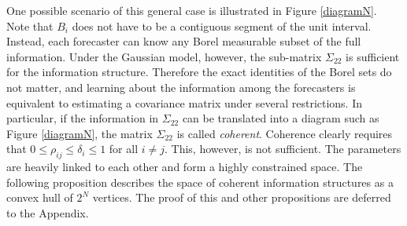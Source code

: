\documentclass[11pt]{article}
\theoremstyle{definition}
\newtheorem{example}[theorem]{Example}
\theoremstyle{definition}
\begin{document}
One possible scenario of this general case is illustrated in Figure \ref{diagramN}. Note that $B_i$ does not have to be a contiguous segment of the unit
interval.  Instead, each forecaster can know any Borel measurable
subset of the full information. Under the Gaussian model, however, the sub-matrix $\Sigma_{22}$ is sufficient for the information structure. Therefore the exact identities of the Borel sets do not matter, and learning about the
information among the forecasters is equivalent to estimating a
covariance matrix under several restrictions.  In particular, if the
information in $\Sigma_{22}$ can be translated into a diagram
such as Figure \ref{diagramN},
the matrix $\Sigma_{22}$ is called \textit{coherent}.  Coherence
clearly requires that $0 \leq \rho_{ij} \leq \delta_i \leq 1$ for all $i \neq j$.  This, however, is not sufficient. The parameters are heavily linked to each other and form a highly constrained space. 
%
The following proposition describes the space of coherent information structures as a convex hull of $2^N$ vertices.
 The proof of this and other propositions are deferred to the Appendix.
\end{document}
